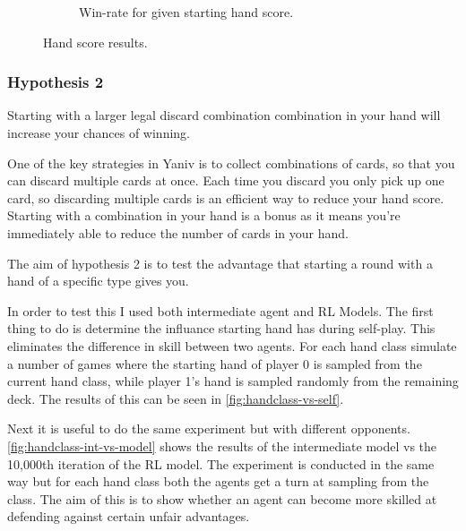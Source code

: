\documentclass[../main.tex]{subfiles}
\begin{document}
\begin{figure}
\begin{subfigure}[t]{0.49\textwidth}
        \caption{Win-rate for given starting hand score.}
        \label{fig:startinghand-winrates}
    \end{subfigure}
    \caption{Hand score results.}
    \label{fig:my_label}
\end{figure}


\subsubsection{Hypothesis 2}
\begin{displayquote}
Starting with a larger legal discard combination combination in your hand will increase your chances of winning.
\end{displayquote}

One of the key strategies in Yaniv is to collect combinations of cards, so that you can discard multiple cards at once. Each time you discard you only pick up one card, so discarding multiple cards is an efficient way to reduce your hand score. Starting with a combination in your hand is a bonus as it means you're immediately able to reduce the number of cards in your hand.

The aim of hypothesis 2 is to test the advantage that starting a round with a hand of a specific type gives you. 

In order to test this I used both intermediate agent and RL Models. The first thing to do is determine the influance starting hand has during self-play. This eliminates the difference in skill between two agents. For each hand class simulate a number of games where the starting hand of player 0 is sampled from the current hand class, while player 1's hand is sampled randomly from the remaining deck. The results of this can be seen in \autoref{fig:handclass-vs-self}. 

Next it is useful to do the same experiment but with different opponents. \autoref{fig:handclass-int-vs-model} shows the results of the intermediate model vs the 10,000th iteration of the RL model. The experiment is conducted in the same way but for each hand class both the agents get a turn at sampling from the class. The aim of this is to show whether an agent can become more skilled at defending against certain unfair advantages. 
\end{document}
